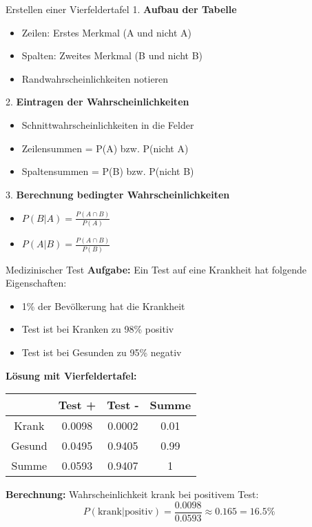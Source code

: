\begin{KR}{Erstellen einer Vierfeldertafel}
1. \textbf{Aufbau der Tabelle}
   \begin{itemize}
   \item Zeilen: Erstes Merkmal (A und nicht A)
   \item Spalten: Zweites Merkmal (B und nicht B)
   \item Randwahrscheinlichkeiten notieren
   \end{itemize}

2. \textbf{Eintragen der Wahrscheinlichkeiten}
   \begin{itemize}
   \item Schnittwahrscheinlichkeiten in die Felder
   \item Zeilensummen = P(A) bzw. P(nicht A)
   \item Spaltensummen = P(B) bzw. P(nicht B)
   \end{itemize}

3. \textbf{Berechnung bedingter Wahrscheinlichkeiten}
   \begin{itemize}
   \item $P(B|A) = \frac{P(A \cap B)}{P(A)}$
   \item $P(A|B) = \frac{P(A \cap B)}{P(B)}$
   \end{itemize}
\end{KR}

\begin{example}{Medizinischer Test}
\textbf{Aufgabe:} Ein Test auf eine Krankheit hat folgende Eigenschaften:
\begin{itemize}
\item 1\% der Bevölkerung hat die Krankheit
\item Test ist bei Kranken zu 98\% positiv
\item Test ist bei Gesunden zu 95\% negativ
\end{itemize}

\textbf{Lösung mit Vierfeldertafel:}
\begin{center}
\begin{tabular}{|c|c|c|c|}
\hline
 & Test + & Test - & Summe \\
\hline
Krank & 0.0098 & 0.0002 & 0.01 \\
\hline
Gesund & 0.0495 & 0.9405 & 0.99 \\
\hline
Summe & 0.0593 & 0.9407 & 1 \\
\hline
\end{tabular}
\end{center}

\textbf{Berechnung:} Wahrscheinlichkeit krank bei positivem Test:
$$P(\text{krank}|\text{positiv}) = \frac{0.0098}{0.0593} \approx 0.165 = 16.5\%$$
\end{example}

